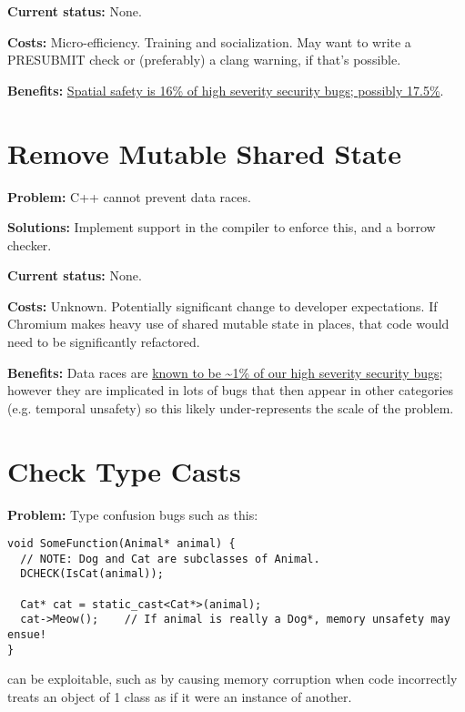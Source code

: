 \documentclass[a4paper,12pt,notitlepage,twoside,openright]{article}
\newcommand{\uline}[1]{#1}
\begin{document}
{\textbf{Current status:} None.

\textbf{Costs:} Micro-efficiency. Training and socialization. May want
to write a PRESUBMIT check or (preferably) a clang warning, if that's
possible.

\textbf{Benefits:} \href{https://docs.google.com/document/d/e/2PACX-1vRZr-HJcYmf2Y76DhewaiJOhRNpjGHCxliAQTBhFxzv1QTae9o8mhBmDl32CRIuaWZLt5kVeH9e9jXv/pub\#h.eoikp3r0cwlf}{\uline{Spatial
safety is 16\% of high severity security bugs; possibly 17.5\%}}.

\section{Remove Mutable Shared State}

\textbf{Problem:} C++ cannot prevent data races.

\textbf{Solutions:} Implement support in the compiler to enforce this,
and a borrow checker.

\textbf{Current status:} None.

\textbf{Costs:} Unknown. Potentially significant change to developer
expectations. If Chromium makes heavy use of shared mutable state in
places, that code would need to be significantly refactored.

\textbf{Benefits:} Data races
are \href{https://docs.google.com/document/d/e/2PACX-1vRZr-HJcYmf2Y76DhewaiJOhRNpjGHCxliAQTBhFxzv1QTae9o8mhBmDl32CRIuaWZLt5kVeH9e9jXv/pub\#h.eoikp3r0cwlf}{\uline{known
to be \textasciitilde1\% of our high severity security bugs}}; however
they are implicated in lots of bugs that then appear in other categories
(e.g. temporal unsafety) so this likely under-represents the scale of
the problem.

\section{Check Type Casts}

\textbf{Problem:} Type confusion bugs such as this:

\begin{verbatim}
void SomeFunction(Animal* animal) {
  // NOTE: Dog and Cat are subclasses of Animal.
  DCHECK(IsCat(animal));

  Cat* cat = static_cast<Cat*>(animal);
  cat->Meow();    // If animal is really a Dog*, memory unsafety may ensue!
}
\end{verbatim}

can be exploitable, such as by causing memory corruption when code
incorrectly treats an object of 1 class as if it were an instance of
another.

}
\end{document}
